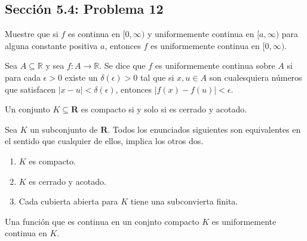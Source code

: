 \subsection{Sección 5.4: Problema 12}

Muestre que si $f$ es continua en $[0,\infty)$ y uniformemente continua en $[a,\infty)$ para alguna constante positiva $a$, entonces $f$ es uniformemente continua en $[0,\infty)$. 
\begin{tcolorbox}[colback=blue!15,colframe=blue!1!blue,title=Definición de continuidad uniforme de \cite{bartle2000introduction}]
Sea $A\subseteq \mathbb{R}$ y sea $f: A\to\mathbb{R}$. Se dice que $f$ es uniformemente continua sobre $A$ si para cada $\epsilon>0$ existe un $\delta(\epsilon)>0$ tal que si $x,u\in A$ son cualesquiera números que satisfacen $|x-u|<\delta(\epsilon)$, entonces $|f(x)-f(u)|<\epsilon$.
\end{tcolorbox}
\begin{tcolorbox}[colback=gray!15,colframe=gray!1!gray,title= Teorema (Caracterización de la compacidad en $\mathbf{R}$) de \cite{abbott2012understanding} ]
Un conjunto $K\subseteq\mathbf{R}$ es compacto si y solo si es cerrado y acotado. 
\end{tcolorbox}

\begin{tcolorbox}[colback=gray!15,colframe=gray!1!gray,title= Teorema  (Heine-Borel) de \cite{abbott2012understanding} ]
Sea $K$ un subconjunto de $\mathbf{R}$. Todos los enunciados siguientes son equivalentes en el sentido que cualquier de ellos, implica los otros dos. 
\begin{enumerate}
    \item $K$ es compacto. 
    \item $K$ es cerrado y acotado.
    \item Cada cubierta abierta para $K$ tiene una subconvierta finita. 
\end{enumerate}
\end{tcolorbox}

\begin{tcolorbox}[colback=gray!15,colframe=gray!1!gray,title= Teorema (Continuidad uniforme en conjuntos compactos) de \cite{abbott2012understanding}]
Una función que es continua en un conjnto compacto $K$ es uniformemente continua en $K$. 

\end{tcolorbox}

